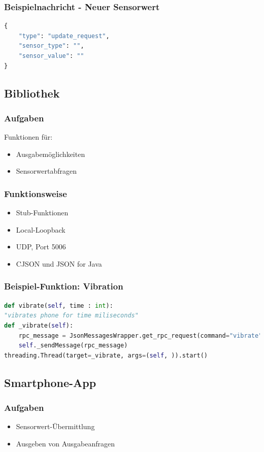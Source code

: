 \documentclass{beamer}
\begin{document}
\begin{frame}[fragile]
    \frametitle{Beispielnachricht - Neuer Sensorwert}
    \begin{lstlisting}[language=python]
{
    "type": "update_request",
    "sensor_type": "",
    "sensor_value": ""
}
\end{lstlisting}
\end{frame}

\subsection{Bibliothek}

\begin{frame}
    \frametitle{Aufgaben}
    Funktionen für:
    \begin{itemize}
        \item Ausgabemöglichkeiten
        \item Sensorwertabfragen
    \end{itemize}
\end{frame}

\begin{frame}
    \frametitle[]{Funktionsweise}
    \begin{itemize}
        \item Stub-Funktionen
        \item Local-Loopback
        \item UDP, Port 5006
        \item CJSON und JSON for Java
    \end{itemize}
\end{frame}

\begin{frame}[fragile]
    \frametitle{Beispiel-Funktion: Vibration}
    \begin{lstlisting}[language=python]
def vibrate(self, time : int):
"vibrates phone for time miliseconds"
def _vibrate(self):
    rpc_message = JsonMessagesWrapper.get_rpc_request(command="vibrate", value=str(time))
    self._sendMessage(rpc_message)
threading.Thread(target=_vibrate, args=(self, )).start()
    \end{lstlisting}
\end{frame}

\subsection{Smartphone-App}

\begin{frame}
    \frametitle{Aufgaben}
    \begin{itemize}
        \item Sensorwert-Übermittlung
        \item Ausgeben von Ausgabeanfragen
    \end{itemize}
\end{frame}
\end{document}
